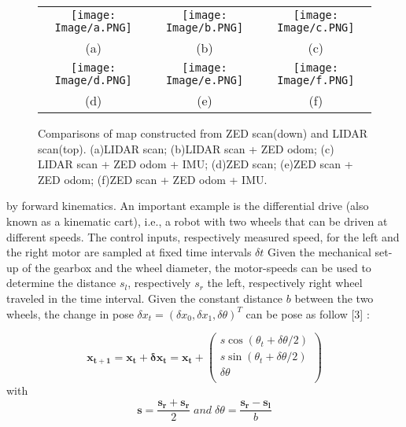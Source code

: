 \documentclass[english]{article}
\begin{document}
\begin{figure}[H]
    \centering
    \begin{tabular}{ccc}
         \texttt{[image: Image/a.PNG]} &  
         \texttt{[image: Image/b.PNG]} & 
         \texttt{[image: Image/c.PNG]} 
         \\ (a) & (b) & (c) \\
         \texttt{[image: Image/d.PNG]} & 
         \texttt{[image: Image/e.PNG]} & 
         \texttt{[image: Image/f.PNG]} 
         \\ (d) & (e) & (f)
    \end{tabular}
    \caption{Comparisons of map constructed from ZED scan(down) and LIDAR scan(top). (a)LIDAR scan; (b)LIDAR
scan + ZED odom; (c) LIDAR scan + ZED odom + IMU; (d)ZED scan; (e)ZED scan + ZED odom; (f)ZED scan + ZED odom + IMU.}
    \label{fig:3}
\end{figure}

\noindent by forward kinematics. An important example is the differential drive (also known as a kinematic cart), i.e., a robot with two wheels that can be driven at different speeds. The control inputs, respectively measured speed, for the left and the right motor are sampled at fixed time intervals $\delta t$ Given the mechanical set-up of the gearbox and the wheel diameter, the motor-speeds can be used to determine the distance $\mathit{s_{l}}$, respectively  $\mathit{s_{r}}$ the left, respectively right wheel traveled in the time interval. Given the constant distance $\mathit{b}$ between the two wheels, the change in pose  $\delta x_{t}= (\delta x_{0},\delta x_{1},\delta \theta)^{T}$ can be pose as follow [3] :

\begin{equation}
    \mathbf{x_{t+1}}=\mathbf{x_{t}}+\mathbf{\delta x_{t}}=\mathbf{x_{t}}+\left(\begin{array}{c}
         s \cos{\left( \theta_{t}+\delta\theta/2\right)} \\
         s \sin{\left(\theta_{t}+\delta\theta/2\right)} \\
         \delta\theta \\
    \end{array}
      \right)
      \label{eq:eq1}
    \end{equation}
    with
    \begin{equation}
        \mathbf{s}=\frac{\mathbf{s_{r}}+\mathbf{s_{r}}}{2}\;and\;\delta\theta =\frac{\mathbf{s_{r}}-\mathbf{s_{l}}}{b} \nonumber
    \end{equation}
    
\end{document}

